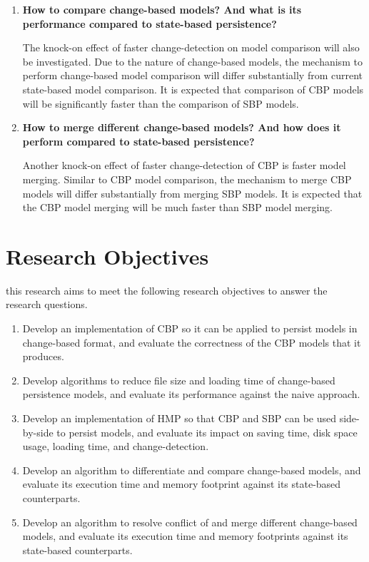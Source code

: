 \documentclass[12pt, a4paper]{report} \usepackage[titletoc]{appendix}
\begin{document}
\begin{enumerate}
	\item \textbf{How to compare change-based models? And what is its performance compared to state-based persistence?} 
	
	The knock-on effect of faster change-detection on model comparison will also be investigated. Due to the nature of change-based models, the mechanism to perform change-based model comparison will differ substantially from current state-based model comparison. It is expected that comparison of CBP models will be significantly faster than the comparison of SBP models.   
	
	\item \textbf{How to merge different change-based models? And how does it perform compared to state-based persistence?}
	
	Another knock-on effect of faster change-detection of CBP is faster model merging. Similar to CBP model comparison, the mechanism to merge CBP models will differ substantially from merging SBP models. It is expected that the CBP model merging will be much faster than SBP model merging.   
	
\end{enumerate}

\section{Research Objectives}
\label{sec:research_objectives}
this research aims to meet the following research objectives to answer the research questions.
\begin{enumerate}
	\item Develop an implementation of CBP so it can be applied to persist models in change-based format, and evaluate the correctness of the CBP models that it produces. 
	\item Develop algorithms to reduce file size and loading time of change-based persistence models, and evaluate its performance against the naive approach. 
	\item Develop an implementation of HMP so that CBP and SBP can be used side-by-side to persist models, and evaluate its impact on saving time, disk space usage, loading time, and change-detection.
	\item Develop an algorithm to differentiate and compare change-based models, and evaluate its execution time and memory footprint against its state-based counterparts.
	\item Develop an algorithm to resolve conflict of and merge different change-based models, and evaluate its execution time and memory footprints against its state-based counterparts. 
\end{enumerate}
\end{document}
